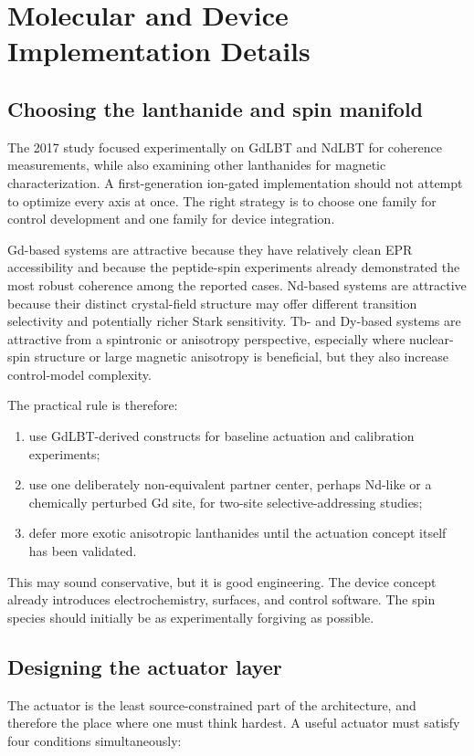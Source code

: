 \documentclass[11pt]{report}
\theoremstyle{definition}
\begin{document}
\chapter{Molecular and Device Implementation Details}

\section{Choosing the lanthanide and spin manifold}
The 2017 study focused experimentally on GdLBT and NdLBT for coherence measurements, while also examining other lanthanides for magnetic characterization. A first-generation ion-gated implementation should not attempt to optimize every axis at once. The right strategy is to choose one family for control development and one family for device integration.

Gd-based systems are attractive because they have relatively clean EPR accessibility and because the peptide-spin experiments already demonstrated the most robust coherence among the reported cases. Nd-based systems are attractive because their distinct crystal-field structure may offer different transition selectivity and potentially richer Stark sensitivity. Tb- and Dy-based systems are attractive from a spintronic or anisotropy perspective, especially where nuclear-spin structure or large magnetic anisotropy is beneficial, but they also increase control-model complexity.

The practical rule is therefore:

\begin{enumerate}[leftmargin=2em]
\item use GdLBT-derived constructs for baseline actuation and calibration experiments;
\item use one deliberately non-equivalent partner center, perhaps Nd-like or a chemically perturbed Gd site, for two-site selective-addressing studies;
\item defer more exotic anisotropic lanthanides until the actuation concept itself has been validated.
\end{enumerate}

This may sound conservative, but it is good engineering. The device concept already introduces electrochemistry, surfaces, and control software. The spin species should initially be as experimentally forgiving as possible.

\section{Designing the actuator layer}
The actuator is the least source-constrained part of the architecture, and therefore the place where one must think hardest. A useful actuator must satisfy four conditions simultaneously:
\end{document}
